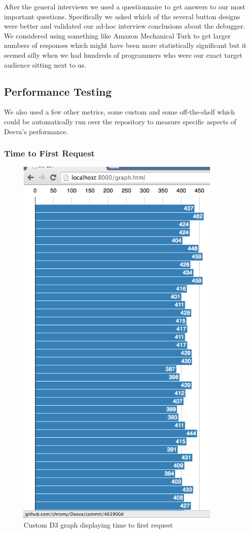 \documentclass[11pt, a4paper]{article}
\begin{document}
After the general interviews we used a questionnaire to get answers to our most important questions.
Specifically we asked which of the several button designs were better and validated our ad-hoc interview conclusions about the debugger.
We considered using something like Amazon Mechanical Turk to get larger numbers of responses which might have been more statistically significant but it seemed silly when we had hundreds of programmers who were our exact target audience sitting next to us.


\subsection{Performance Testing}
We also used a few other metrics, some custom and some off-the-shelf which could be automatically run over the repository to measure specific aspects of Deeva’s performance.

\subsubsection{Time to First Request}

\begin{figure}[h!]
\centering
\includegraphics[width=100mm]{timeToFirstRequest.png}
\caption{Custom D3 graph displaying  time to first request}
\label{fig:timeToFirstRequest}
\end{figure}
\end{document}
